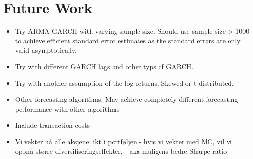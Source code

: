 \chapter{Future Work} \label{FutureWork}

\begin{itemize}
    \item Try ARMA-GARCH with varying sample size. Should use sample size > 1000 to achieve efficient standard error estimates as the standard errors are only valid asymptotically.
    \item Try with different GARCH lags and other typs of GARCH.
    \item Try with another assumption of the log returns. Skewed or t-distributed. 
    \item Other forecasting algorithms. May achieve completely different forecasting performance with other algorithms
    \item Include transaction costs
    \item Vi vekter nå alle aksjene likt i portføljen - hvis vi vekter med MC, vil vi oppnå større diversifiseringseffekter, - aka muligens bedre Sharpe ratio
\end{itemize}

